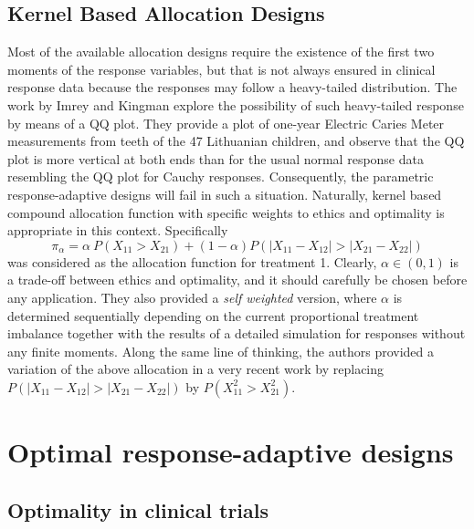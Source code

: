 \subsection{Kernel Based Allocation Designs}

Most of the available allocation designs require the existence of the first two moments of the response variables, but that is not always ensured in clinical response data because the responses may follow a heavy-tailed distribution. The work by Imrey and Kingman\cite{40} explore the possibility of such heavy-tailed response by means of a QQ plot. They provide a plot of one-year Electric Caries Meter measurements from teeth of the 47 Lithuanian children, and observe that the QQ plot is more vertical at both  ends than for the usual normal response data resembling the QQ plot for Cauchy responses. Consequently, the parametric response-adaptive designs will fail in such a situation. Naturally, kernel based compound allocation function  with specific weights to ethics and optimality is appropriate in this context\cite{25}. Specifically 
$$\pi_{\alpha}=\alpha ~P(X_{11}>X_{21})+(1-\alpha )P(|X_{11}-X_{12}|>|X_{21}-X_{22}|)$$
was considered as the allocation function for treatment 1. Clearly, $\alpha\in (0,1)$ is a trade-off between ethics and optimality, and it should carefully be chosen before any application. They\cite{25} also provided a \textit{self weighted} version, where $\alpha$ is determined sequentially depending on the current proportional treatment imbalance together with the results of a detailed simulation for responses without any finite moments. Along the same line of thinking, the authors provided a variation of the above allocation\cite{26} in a very recent work  by replacing $P(|X_{11}-X_{12}|>|X_{21}-X_{22}|)$  by $P(X^{2}_{11}>X^{2}_{21}).$

\section{Optimal response-adaptive designs}

\subsection{Optimality in clinical trials}

